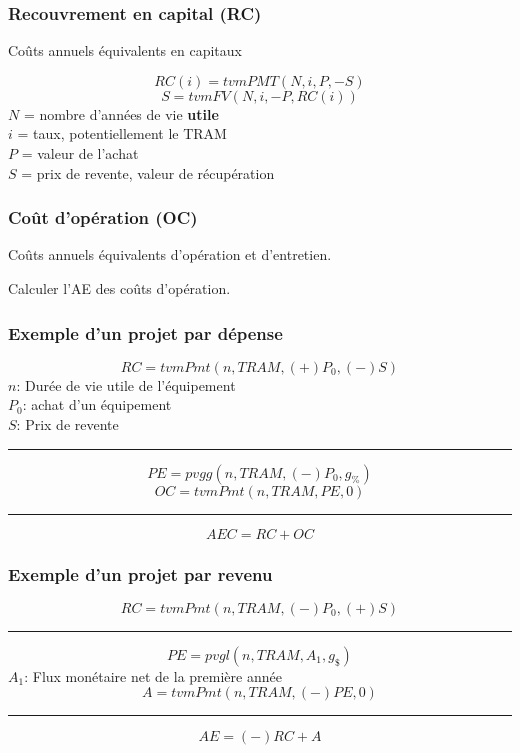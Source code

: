 \subsubsection{Recouvrement en capital (RC)}
     Coûts annuels équivalents en capitaux
    \begin{RoundBox}
        $$RC(i)=tvmPMT(N,i,P,-S)$$
        $$S=tvmFV(N,i,-P,RC(i))$$
        {\scriptsize
        $N$ = nombre d'années de vie \textbf{utile}\\
        $i$ = taux, potentiellement le TRAM\\
        $P$ = valeur de l'achat\\
        $S$ = prix de revente, valeur de récupération
        }
    \end{RoundBox}

\subsubsection{Coût d'opération (OC)}
     Coûts annuels équivalents d'opération et d'entretien.

    Calculer l'AE des coûts d'opération.
    
\subsubsection{Exemple d'un projet par dépense}
    $$RC = tvmPmt(n,TRAM, (+)P_0, (-)S)$$
    {\footnotesize
        $n$: Durée de vie utile de l'équipement\\
        $P_0$: achat d'un équipement\\
        $S$: Prix de revente\\
    }
    \hrule
    $$PE = pvgg(n,TRAM,(-)P_0,g_\%)$$
    $$OC = tvmPmt(n,TRAM,PE,0)$$
    \hrule
    $$AEC = RC + OC$$

\subsubsection{Exemple d'un projet par revenu}
    $$RC=tvmPmt(n,TRAM,(-)P_0, (+)S)$$
    \hrule
    $$PE=pvgl(n,TRAM,A_1,g_\$)$$
    {\footnotesize
        $A_1$: Flux monétaire net de la première année\\
    }
    $$A=tvmPmt(n,TRAM,(-)PE,0)$$
    \hrule
    $$AE=(-)RC+A$$
